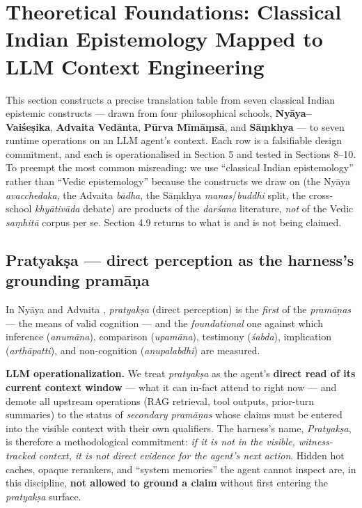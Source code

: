 \section{Theoretical Foundations: Classical Indian Epistemology Mapped to LLM Context Engineering}\label{theoretical-foundations-classical-indian-epistemology-mapped-to-llm-context-engineering}

This section constructs a precise translation table from seven classical Indian epistemic constructs --- drawn from four philosophical schools, \textbf{Nyāya--Vaiśeṣika}, \textbf{Advaita Vedānta}, \textbf{Pūrva Mīmāṃsā}, and \textbf{Sāṃkhya} --- to seven runtime operations on an LLM agent's context. Each row is a falsifiable design commitment, and each is operationalised in Section 5 and tested in Sections 8--10. To preempt the most common misreading: we use ``classical Indian epistemology'' rather than ``Vedic epistemology'' because the constructs we draw on (the Nyāya \emph{avacchedaka}, the Advaita \emph{bādha}, the Sāṃkhya \emph{manas}/\emph{buddhi} split, the cross-school \emph{khyātivāda} debate) are products of the \emph{darśana} literature, \emph{not} of the Vedic \emph{saṃhitā} corpus per se. Section 4.9 returns to what is and is not being claimed.

\subsection{Pratyakṣa --- direct perception as the harness's grounding pramāṇa}\label{pratyakux1e63a-direct-perception-as-the-harnesss-grounding-pramux101ux1e47a}

In Nyāya \citep{aksapada200nyayasutra, matilal1986perception, phillips2012epistemology} and Advaita \citep{dharmaraja17vedantaparibhasa, datta1932advaita}, \emph{pratyakṣa} (direct perception) is the \emph{first} of the \emph{pramāṇas} --- the means of valid cognition --- and the \emph{foundational} one against which inference (\emph{anumāna}), comparison (\emph{upamāna}), testimony (\emph{śabda}), implication (\emph{arthāpatti}), and non-cognition (\emph{anupalabdhi}) are measured.

\textbf{LLM operationalization.} We treat \emph{pratyakṣa} as the agent's \textbf{direct read of its current context window} --- what it can in-fact attend to right now --- and demote all upstream operations (RAG retrieval, tool outputs, prior-turn summaries) to the status of \emph{secondary pramāṇas} whose claims must be entered into the visible context with their own qualifiers. The harness's name, \emph{Pratyakṣa}, is therefore a methodological commitment: \emph{if it is not in the visible, witness-tracked context, it is not direct evidence for the agent's next action}. Hidden hot caches, opaque rerankers, and ``system memories'' the agent cannot inspect are, in this discipline, \textbf{not allowed to ground a claim} without first entering the \emph{pratyakṣa} surface.

